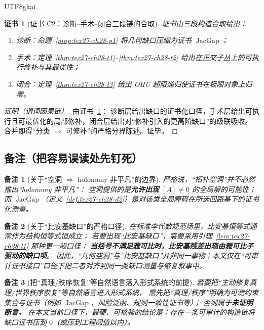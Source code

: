 \documentclass[12pt]{article}
\newtheorem{remark}{备注}[section]
\newtheorem{Certificate}{证书}[section]
\newcommand{\JacGap}{\operatorname{JacGap}}
\begin{document}
\begin{CJK*}{UTF8}{gkai}
\begin{Certificate}[证书 C2：诊断--手术--闭合三段链的合取]
\label{cert:tex27-ch28-c2}
证书由三段构造合取给出：
\begin{enumerate}
  \item 诊断：命题~\ref{prop:tex27-ch28-p1} 将几何缺口压缩为证书 $\JacGap$；
  \item 手术：定理~\ref{thm:tex27-ch28-t1}--\ref{thm:tex27-ch28-t2} 给出在正交子丛上的可执行修补与其最优性；
  \item 闭合：定理~\ref{thm:tex27-ch28-t3} 给出 OHU 超限递归使证书在极限对象上归零。
\end{enumerate}
\end{Certificate}

\begin{proof}[证明（谓词因果链）]
由证书~\ref{cert:tex27-ch28-c2}：
诊断层给出缺口的证书化口径，手术层给出可执行且可最优化的局部修补，闭合层给出对“修补引入的更高阶缺口”的级联吸收。
合并即得“分类 $\Rightarrow$ 可修补”的严格分界陈述。证毕。
\end{proof}

\subsection{备注（把容易误读处先钉死）}
\label{subsec:tex27-ch28-remarks}

\begin{remark}[关于“空洞 $\Rightarrow$ holonomy 非平凡”的边界]
严格说，“拓扑空洞”并不必然推出“holonomy 非平凡”：
空洞提供的是\textbf{允许出现} $[A]\neq 0$ 的全局解的可能性；
而 $\JacGap$（定义~\ref{def:tex27-ch28-d2}）是对该类全局障碍在所选回路基下的证书化测量。
\end{remark}

\begin{remark}[关于“比安基缺口”的严格口径]
在标准李代数规范场里，比安基恒等式通常作为结构恒等式恒成立；
若要出现“比安基缺口”，需要采用引理~\ref{lem:tex27-ch28-l1} 那种更一般口径：
\textbf{当括号不满足雅可比时，比安基残差出现由雅可比子驱动的缺口项}。
因此，“几何空洞”与“比安基缺口”并非同一事物；本文仅在“可审计证书接口”口径下把二者对齐到同一类缺口测量与修复叙事中。
\end{remark}

\begin{remark}[把“真理/秩序恢复”等自然语言落入形式系统的前提]
若要把“主动修复真理/世界秩序恢复”等自然语言进入形式系统，
需先把“真理/秩序”明确为可测约束集合与证书（例如 $\JacGap$、风险泛函、规则一致性证书等）；
否则属于\textbf{未证明断言}。
在本文当前口径下，最硬、可核验的结论是：存在一条可审计的构造链将缺口证书压到 $0$（或压到工程阈值以内）。
\end{remark}


\end{CJK*}
\end{document}
